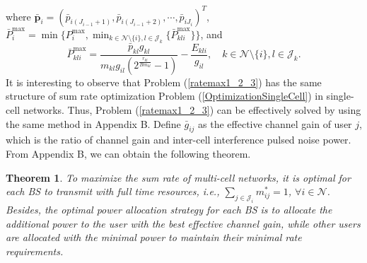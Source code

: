 \documentclass[journal]{IEEEtran}
\newtheorem{theorem}{Theorem}
\begin{document}
where $\pmb{\bar p}_i=(\bar p_{i (J_{i-1}+1)}, \bar p_{i (J_{i-1}+2)}, \cdots, \bar p_{i J_{i}})^T$, $\bar P_i^{\max}=\min\{P_i^{\max},\min_{k \in \mathcal N\setminus \{i\}, l \in  \mathcal J_k} \{\bar P_{kli}^{\max}\}\}$, and
\begin{equation}\label{ratemax1_2_4}
\bar P_{kli}^{\max}=\frac{\bar p_{kl}g_{kl}}
{m_{kl} g_{il}\left(2^{\frac{r_{kl}}{B m_{kl}}}-1\right)}-\frac{E_{kli}}{g_{il}}, \quad  k \in \mathcal N\setminus \{i\}, l \in  \mathcal J_k.
\end{equation}
It is interesting to observe that Problem (\ref{ratemax1_2_3}) has the same structure of sum rate optimization Problem (\ref{OptimizationSingleCell}) in single-cell networks.
Thus, Problem (\ref{ratemax1_2_3}) can be effectively solved by using the same method in Appendix B.
Define $\bar g_{ij}$ as the effective channel gain of user $j$, which is the ratio of channel gain and inter-cell interference pulsed noise power.
From Appendix B, we can obtain the following theorem.
\begin{theorem} \label{theoremmulticellrate}
To maximize the sum rate of multi-cell networks, it is optimal for each BS to transmit with full time resources, i.e., $\sum_{j\in\mathcal J_i} m_{ij}^*=1$, $\forall i \in \mathcal N$.
Besides, the optimal power allocation strategy for each BS is to allocate
the additional power to the user with the best effective channel gain,
while other users are allocated with the minimal power to
maintain their minimal rate requirements.
\end{theorem}
\end{document}
